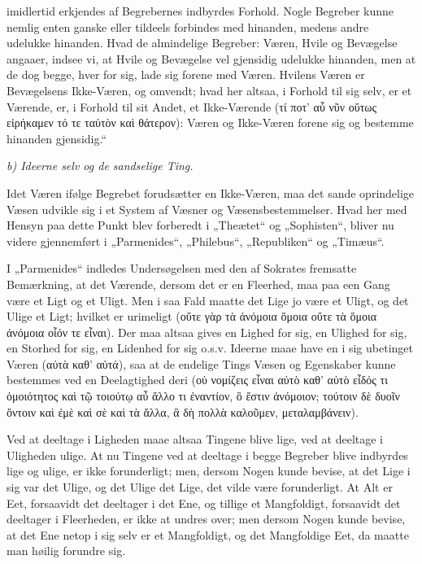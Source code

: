 \documentclass[12pt]{book}
\newcommand{\opage}[1]{\marginnote{\footnotesize\textit{[#1]}}}
\begin{document}
imidlertid erkjendes af Begrebernes indbyrdes Forhold. Nogle Begreber kunne nemlig enten ganske
eller tildeels forbindes med hinanden, medens andre udelukke hinanden. Hvad de almindelige
Begreber: Væren, Hvile og Bevægelse angaaer, indsee vi, at Hvile og Bevægelse vel gjensidig
udelukke hinanden, men at de dog begge, hver for sig, lade sig forene med Væren. Hvilens Væren
er Bevægelsens Ikke-Væren, og omvendt; hvad her altsaa, i Forhold til sig selv, er et Værende,
er, i Forhold til sit Andet, et Ikke-Værende (τί ποτ' αὖ νῦν οὕτως εἰρήκαμεν τό τε ταὐτὸν καὶ
θάτερον): Væren og Ikke-Væren forene sig og bestemme hinanden gjensidig.“

\emph{b) Ideerne selv og de sandselige Ting.}

Idet Væren ifølge Begrebet forudsætter en Ikke-Væren, maa det sande oprindelige Væsen udvikle
sig i et System af Væsner og Væsensbestemmelser. Hvad her med Hensyn paa dette Punkt blev
forberedt i „Theætet“ og „Sophisten“, bliver nu videre gjennemført i „Parmenides“, „Philebus“,
„Republiken“ og „Timæus“.

I „Parmenides“ indledes Undersøgelsen med den af Sokrates fremsatte Bemærkning, at det Værende,
dersom det er en Fleerhed, maa paa een Gang være et Ligt og et Uligt. Men i saa Fald maatte det
Lige jo være et Uligt, og
\opage{130} det Ulige et Ligt; hvilket er urimeligt (οὔτε γὰρ τὰ ἀνόμοια ὅμοια οὔτε τὰ ὅμοια ἀνόμοια οἷόν τε
εἶναι). Der maa altsaa gives en Lighed for sig, en Ulighed for sig, en Storhed for sig, en
Lidenhed for sig o.s.v. Ideerne maae have en i sig ubetinget Væren (αὐτὰ καθ' αὑτά), saa at de
endelige Tings Væsen og Egenskaber kunne bestemmes ved en Deelagtighed deri (οὐ νομίζεις εἶναι
αὐτὸ καθ' αὑτὸ εἶδός τι ὁμοιότητος καὶ τῷ τοιούτῳ αὖ ἄλλο τι ἐναντίον, ὃ ἔστιν ἀνόμοιον; τούτοιν
δὲ δυοῖν ὄντοιν καὶ ἐμὲ καὶ σὲ καὶ τὰ ἄλλα, ἃ δὴ πολλὰ καλοῦμεν, μεταλαμβάνειν).

Ved at deeltage i Ligheden maae altsaa Tingene blive lige, ved at deeltage i Uligheden ulige.
At nu Tingene ved at deeltage i begge Begreber blive indbyrdes lige og ulige, er ikke
forunderligt; men, dersom Nogen kunde bevise, at det Lige i sig var det Ulige, og det Ulige det
Lige, det vilde være forunderligt. At Alt er Eet, forsaavidt det deeltager i det Ene, og tillige
et Mangfoldigt, forsaavidt det deeltager i Fleerheden, er ikke at undres over; men dersom Nogen
kunde bevise, at det Ene netop i sig selv er et Mangfoldigt, og det Mangfoldige Eet, da maatte
man høilig forundre sig.
\end{document}
